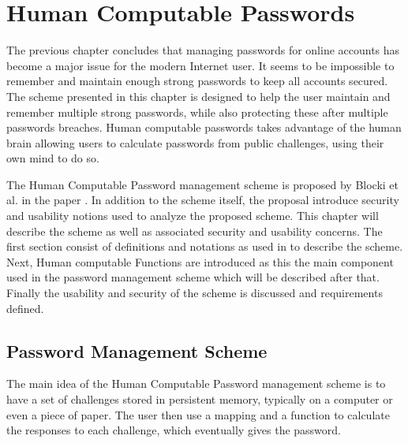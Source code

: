 \chapter{Human Computable Passwords}
The previous chapter concludes that managing passwords for online accounts has become a major issue for the modern Internet user. It seems to be impossible to remember and maintain enough strong passwords to keep all accounts secured. The scheme presented in this chapter is designed to help the user maintain and remember multiple strong passwords, while also protecting these after multiple passwords breaches. Human computable passwords takes advantage of the human brain allowing users to calculate passwords from public challenges, using their own mind to do so. 

\par The Human Computable Password management scheme is proposed by Blocki et al. in the paper \cite{hcp-blocki}. In addition to the scheme itself, the proposal introduce security and usability notions used to analyze the proposed scheme. This chapter will describe the scheme as well as associated security and usability concerns. The first section consist of definitions and notations as used in \cite{hcp-blocki} to describe the scheme. Next, Human computable Functions are introduced as this the main component used in the password management scheme which will be described after that. Finally the usability and security of the scheme is discussed and requirements defined.

\section{Password Management Scheme}
The main idea of the Human Computable Password management scheme is to have a set of challenges stored in persistent memory, typically on a computer or even a piece of paper. The user then use a mapping and a function to calculate the responses to each challenge, which eventually gives the password.

